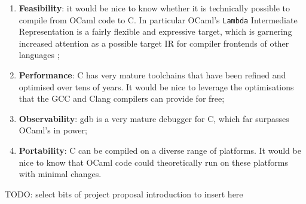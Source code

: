 \documentclass[12pt,a4paper,twoside,openright]{report}
\begin{document}
\begin{enumerate}
    \item \textbf{Feasibility}: it would be nice to know whether it is
        technically possible to compile from OCaml code to C. In particular OCaml's
        \lstinline!Lambda! Intermediate Representation is a fairly flexible and
        expressive target, which is garnering increased attention as a possible
        target IR for compiler frontends of other languages \cite{dolan16};
    \item \textbf{Performance}: C has very mature toolchains that have been
        refined and optimised over tens of years. It would be nice to leverage
        the optimisations that the GCC and Clang compilers can provide for
        free;
    \item \textbf{Observability}: gdb is a very mature debugger for C, which
        far surpasses OCaml's in power;
    \item \textbf{Portability}: C can be compiled on a diverse range of
        platforms. It would be nice to know that OCaml code could theoretically
        run on these platforms with minimal changes.
\end{enumerate}

TODO: select bits of project proposal introduction to insert here
\end{document}
